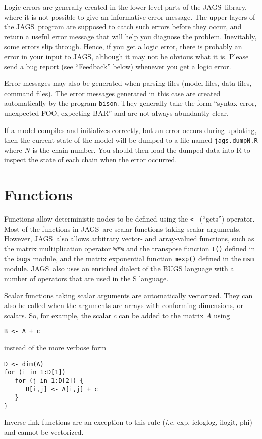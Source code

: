 \documentclass[11pt, a4paper, titlepage]{report}
\newcommand{\JAGS}{\textsf{JAGS}}
\begin{document}
Logic errors are generally created in the lower-level parts of the \JAGS\
library, where it is not possible to give an informative error message.
The upper layers of the \JAGS\ program are supposed to catch such errors
before they occur, and return a useful error message that will help you
diagnose the problem.  Inevitably, some errors slip through. Hence,
if you get a logic error, there is probably an error in your input to
\JAGS, although it may not be obvious what it is. Please send a bug
report (see ``Feedback'' below) whenever you get a logic error.

Error messages may also be generated when parsing files (model files,
data files, command files).  The error messages generated in this case
are created automatically by the program \texttt{bison}. They
generally take the form ``syntax error, unexpected FOO, expecting BAR''
and are not always abundantly clear.

If a model compiles and initializes correctly, but an error occurs
during updating, then the current state of the model will be dumped
to a file named \verb+jags.dumpN.R+ where $N$ is the chain number.
You should then load the dumped data into R to inspect the state of
each chain when the error occurred.

\chapter{Functions}
\label{section:functions}

Functions allow deterministic nodes to be defined using the \verb+<-+
(``gets'') operator.  Most of the functions in \JAGS\ are scalar
functions taking scalar arguments. However, \JAGS\ also allows
arbitrary vector- and array-valued functions, such as the matrix
multiplication operator \verb+%*%+ and the transpose function
\verb+t()+ defined in the \verb+bugs+ module, and the matrix
exponential function \verb+mexp()+ defined in the \verb+msm+
module. \JAGS\ also uses an enriched dialect of the BUGS language with
a number of operators that are used in the S language.

Scalar functions taking scalar arguments are automatically vectorized.
They can also be called when the arguments are arrays with conforming
dimensions, or scalars. So, for example, the scalar $c$ can be added to
the matrix $A$ using
\begin{verbatim}
B <- A + c
\end{verbatim}
instead of the more verbose form
\begin{verbatim}
D <- dim(A)
for (i in 1:D[1])
   for (j in 1:D[2]) {
      B[i,j] <- A[i,j] + c
   }
}
\end{verbatim}
Inverse link functions are an exception to this rule ({\em i.e.} exp,
icloglog, ilogit, phi) and cannot be vectorized. 
\end{document}
